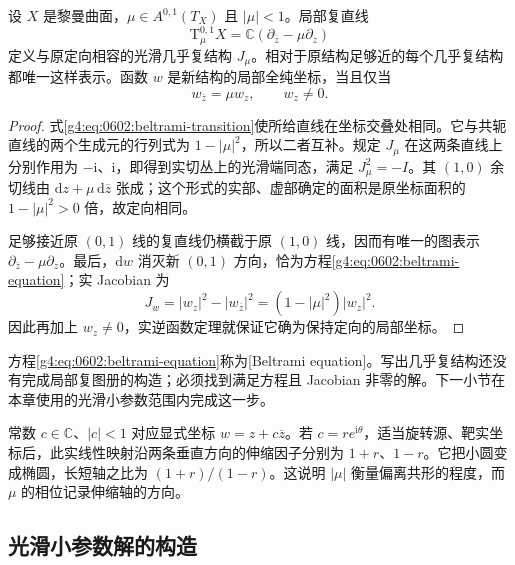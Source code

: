 \begin{proposition}\label{g4:prop:0602:almost-complex}
	设 \(X\) 是黎曼曲面，\(\mu\in A^{0,1}(T_X)\) 且 \(|\mu|<1\)。局部复直线
	\[
		\mathrm{T}^{0,1}_{\mu}X
		=\mathbb C(\partial_{\overline z}-\mu\partial_z)
	\]
	定义与原定向相容的光滑几乎复结构 \(J_\mu\)。相对于原结构足够近的每个几乎复结构都唯一这样表示。函数 \(w\) 是新结构的局部全纯坐标，当且仅当
	\begin{equation}\label{g4:eq:0602:beltrami-equation}
		w_{\overline z}=\mu w_z,\qquad w_z\ne0.
	\end{equation}
\end{proposition}
\begin{proof}
	式\eqref{g4:eq:0602:beltrami-transition}使所给直线在坐标交叠处相同。它与共轭直线的两个生成元的行列式为 \(1-|\mu|^2\)，所以二者互补。规定 \(J_\mu\) 在这两条直线上分别作用为 \(-\mathrm{i}\)、\(\mathrm{i}\)，即得到实切丛上的光滑端同态，满足 \(J_\mu^2=-I\)。其 \((1,0)\) 余切线由 \(\mathrm{d}z+\mu\,\mathrm{d}\overline z\) 张成；这个形式的实部、虚部确定的面积是原坐标面积的 \(1-|\mu|^2>0\) 倍，故定向相同。

	足够接近原 \((0,1)\) 线的复直线仍横截于原 \((1,0)\) 线，因而有唯一的图表示 \(\partial_{\overline z}-\mu\partial_z\)。最后，\(\mathrm{d}w\) 消灭新 \((0,1)\) 方向，恰为方程\eqref{g4:eq:0602:beltrami-equation}；实 Jacobian 为
	\[
		J_w=|w_z|^2-|w_{\overline z}|^2
		=(1-|\mu|^2)|w_z|^2.
	\]
	因此再加上 \(w_z\ne0\)，实逆函数定理就保证它确为保持定向的局部坐标。
\end{proof}

方程\eqref{g4:eq:0602:beltrami-equation}称为[Beltrami equation]。写出几乎复结构还没有完成局部复图册的构造；必须找到满足方程且 Jacobian 非零的解。下一小节在本章使用的光滑小参数范围内完成这一步。

\begin{example}\label{g4:exm:0602:constant-beltrami}
	常数 \(c\in\mathbb C\)、\(|c|<1\) 对应显式坐标 \(w=z+c\overline z\)。若 \(c=re^{\mathrm{i}\theta}\)，适当旋转源、靶实坐标后，此实线性映射沿两条垂直方向的伸缩因子分别为 \(1+r\)、\(1-r\)。它把小圆变成椭圆，长短轴之比为 \((1+r)/(1-r)\)。这说明 \(|\mu|\) 衡量偏离共形的程度，而 \(\mu\) 的相位记录伸缩轴的方向。
\end{example}

\subsection{光滑小参数解的构造}
\label{g4:subsec:0602:02}

